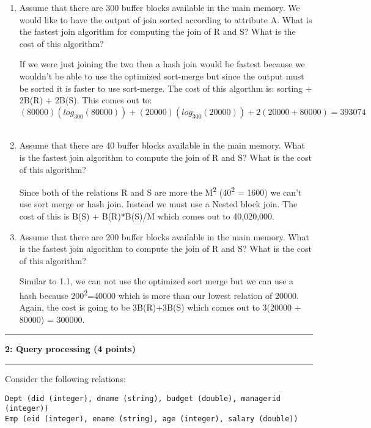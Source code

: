 \documentclass[11pt]{article}
\newcommand\question[2]{\vspace{.25in}\hrule\textbf{#1: #2}\vspace{.5em}\hrule\vspace{.10in}}
\begin{document}
\begin{enumerate}
\item Assume that there are 300 buffer blocks available in the main memory.
We would like to have the output of join sorted according to attribute A.
What is the fastest join algorithm for computing the join of R and S? What is the cost of this algorithm? \\
\vspace{3mm}

If we were just joining the two then a hash join would be fastest because we wouldn't be able to use the optimized sort-merge but since the output must be sorted it is faster to use sort-merge. The cost of this algorthm is: sorting + 2B(R) + 2B(S). This comes out to: \[(80000)(log_{300}(80000))+(20000)(log_{300}(20000))+2(20000 + 80000) = 393074 \] \\

\item Assume that there are 40 buffer blocks available in the main memory.
What is the fastest join algorithm to compute the join of R and S? What is the cost of this algorithm? \\
\vspace{3mm}

Since both of the relations R and S are more the M\textsuperscript{2} (40\textsuperscript{2} = 1600) we can't use sort merge or hash join. Instead we must use a Nested block join. The cost of this is B(S) + B(R)*B(S)/M which comes out to 40,020,000. \\

\item Assume that there are 200 buffer blocks available in the main memory. What is the fastest join
algorithm to compute the join of R and S? What is the cost of this algorithm? \\
\vspace{3mm}

Similar to 1.1, we can not use the optimized sort merge but we can use a hash because 200\textsuperscript{2}=40000 which is more than our lowest relation of 20000. Again, the cost is going to be 3B(R)+3B(S) which comes out to 3(20000 + 80000) = 300000. \\

\end{enumerate}



\question{2}{Query processing  (4 points)}
Consider the following relations:
\begin{verbatim}
Dept (did (integer), dname (string), budget (double), managerid (integer))
Emp (eid (integer), ename (string), age (integer), salary (double))
\end{verbatim}
\end{document}
